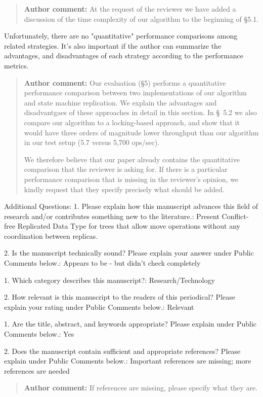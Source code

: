\documentclass[10pt]{article}
\newcommand{\authorcomment}[1]{\begin{quote}\textbf{Author comment:} #1\end{quote}}
\begin{document}
\authorcomment{At the request of the reviewer we have added a discussion of the time complexity of our algorithm to the beginning of {\S}5.1.}
\begin{spverbatim}
Unfortunately, there are no "quantitative" performance comparisons among related strategies. It’s also important if the author can summarize the advantages, and disadvantages of each strategy according to the performance metrics.
\end{spverbatim}
\authorcomment{Our evaluation ({\S}5) performs a quantitative performance comparison between two implementations of our algorithm and state machine replication.
We explain the advantages and disadvantgaes of these approaches in detail in this section.
In \S~5.2 we also compare our algorithm to a locking-based approach, and show that it would have three orders of magnitude lower throughput than our algorithm in our test setup (5.7 versus 5,700 ops/sec).

We therefore believe that our paper already contains the quantitative comparison that the reviewer is asking for.
If there is a particular performance comparison that is missing in the reviewer's opinion, we kindly request that they specify precisely what should be added.}
\begin{spverbatim}

Additional Questions:
1.  Please explain how this manuscript advances this field of research and/or contributes something new to the literature.: Present Conflict-free Replicated Data Type for trees that allow move operations without any coordination between replicas.

2. Is the manuscript technically sound? Please explain your answer under Public Comments below.: Appears to be - but didn't check completely

1. Which category describes this manuscript?: Research/Technology

2. How relevant is this manuscript to the readers of this periodical? Please explain your rating under Public Comments below.: Relevant

1. Are the title, abstract, and keywords appropriate? Please explain under Public Comments below.: Yes

2. Does the manuscript contain sufficient and appropriate references? Please explain under Public Comments below.: Important references are missing; more references are needed
\end{spverbatim}
\authorcomment{If references are missing, please specify what they are.}
\end{document}
